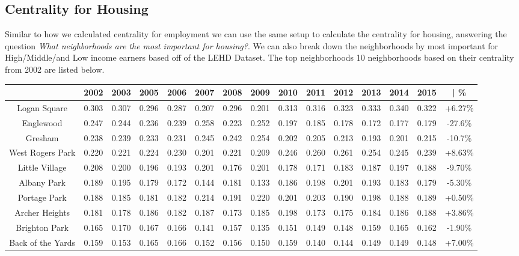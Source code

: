 \documentclass{article}
\theoremstyle{definition}
\theoremstyle{remark}
\begin{document}
\subsection{Centrality for Housing}
Similar to how we calculated centrality for employment we can use the same setup to calculate the centrality for housing, answering the question \textit{What neighborhoods are the most important for housing?}.  We can also break down the neighborhoods by most important for High/Middle/and Low income earners based off of the LEHD Dataset.  The top neighborhoods 10 neighborhoods based on their centrality from 2002 are listed below. \\

\begin{adjustbox}{center}
\begin{tabular}{||c | c c c c c c c c c c c c c | c ||} 
 \hline
 & 2002 & 2003 & 2005 & 2006 & 2007 & 2008 & 2009 & 2010 & 2011 & 2012 & 2013 & 2014 & 2015 & | \%\\[0.5ex] 
 \hline\hline
Logan Square      & 0.303 & 0.307 & 0.296 & 0.287 & 0.207 & 0.296 & 0.201 & 0.313 & 0.316 & 0.323 & 0.333 & 0.340 & 0.322 & +6.27\% \\
Englewood         & 0.247 & 0.244 & 0.236 & 0.239 & 0.258 & 0.223 & 0.252 & 0.197 & 0.185 & 0.178 & 0.172 & 0.177 & 0.179 & -27.6\% \\
Gresham           & 0.238 & 0.239 & 0.233 & 0.231 & 0.245 & 0.242 & 0.254 & 0.202 & 0.205 & 0.213 & 0.193 & 0.201 & 0.215 & -10.7\% \\
West Rogers Park  & 0.220 & 0.221 & 0.224 & 0.230 & 0.201 & 0.221 & 0.209 & 0.246 & 0.260 & 0.261 & 0.254 & 0.245 & 0.239 & +8.63\% \\
Little Village    & 0.208 & 0.200 & 0.196 & 0.193 & 0.201 & 0.176 & 0.201 & 0.178 & 0.171 & 0.183 & 0.187 & 0.197 & 0.188 & -9.70\% \\
Albany Park       & 0.189 & 0.195 & 0.179 & 0.172 & 0.144 & 0.181 & 0.133 & 0.186 & 0.198 & 0.201 & 0.193 & 0.183 & 0.179 & -5.30\% \\
Portage Park      & 0.188 & 0.185 & 0.181 & 0.182 & 0.214 & 0.191 & 0.220 & 0.201 & 0.203 & 0.190 & 0.198 & 0.188 & 0.189 & +0.50\% \\
Archer Heights    & 0.181 & 0.178 & 0.186 & 0.182 & 0.187 & 0.173 & 0.185 & 0.198 & 0.173 & 0.175 & 0.184 & 0.186 & 0.188 & +3.86\% \\
Brighton Park     & 0.165 & 0.170 & 0.167 & 0.166 & 0.141 & 0.157 & 0.135 & 0.151 & 0.149 & 0.148 & 0.159 & 0.165 & 0.162 & -1.90\% \\
Back of the Yards & 0.159 & 0.153 & 0.165 & 0.166 & 0.152 & 0.156 & 0.150 & 0.159 & 0.140 & 0.144 & 0.149 & 0.149 & 0.148 & +7.00\% \\
 \hline
 \end{tabular}
\end{adjustbox}
\\
\end{document}
